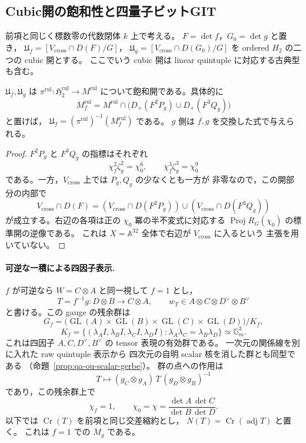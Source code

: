 
\subsection{Cubic開の飽和性と四量子ビットGIT}
\label{subsec:qa-global-cubic-git-comparison}

前項と同じく標数零の代数閉体 $k$ 上で考える。
$F=\det f$，$G_0=\det g$ と置き，
$\mathfrak U_f=[V_{\mathrm{cross}}\cap D(F)/G]$，
$\mathfrak U_g=[V_{\mathrm{cross}}\cap D(G_0)/G]$
を ordered $H_2$ の二つの cubic 開とする。
ここでいう cubic 開は linear quintuple に対応する古典型も含む。

\begin{proposition}[二つのcubic開は飽和している]
\label{prop:qa-global-cubic-opens-saturated}
$\mathfrak U_f,\mathfrak U_g$ は
$\pi^{\mathrm{rul}}:\mathfrak H_2^{\mathrm{rul}}\to M^{\mathrm{rul}}$
について飽和開である。具体的に
\[
 M_f^{\mathrm{rul}}
  =M^{\mathrm{rul}}\cap
       \bigl(D_+(F^2P_g)\cup D_+(F^3Q_g)\bigr)
\]
と置けば，
$\mathfrak U_f=(\pi^{\mathrm{rul}})^{-1}(M_f^{\mathrm{rul}})$ である。
$g$ 側は $f,g$ を交換した式で与えられる。
\end{proposition}
\begin{proof}
$F^2P_g$ と $F^3Q_g$ の指標はそれぞれ
\[
 \chi_f^2\zeta_g^2=\chi_0^6,\qquad
 \chi_f^3\zeta_g^3=\chi_0^9
\]
である。一方，$V_{\mathrm{cross}}$ 上では $P_g,Q_g$ の少なくとも一方が
非零なので，この開部分の内部で
\[
 V_{\mathrm{cross}}\cap D(F)
 =
 (V_{\mathrm{cross}}\cap D(F^2P_g))
 \cup
 (V_{\mathrm{cross}}\cap D(F^3Q_g))
\]
が成立する。右辺の各項は正の $\chi_0$ 冪の半不変式に対応する
$\operatorname{Proj}R_G(\chi_0)$ の標準開の逆像である。
これは $X=\mathbb A^{32}$ 全体で右辺が $V_{\mathrm{cross}}$ に入るという
主張を用いていない。
\end{proof}

\paragraph{可逆な一積による四因子表示.}
$f$ が可逆なら $W=C\otimes A$ と同一視して $f=1$ とし，
\[
 T=f^{-1}g:D\otimes B\longrightarrow C\otimes A,\qquad
 w_T\in A\otimes C\otimes D^\vee\otimes B^\vee
\]
と書ける。この gauge の残余群は
\[
 G_f=
 \bigl(\operatorname{GL}(A)\times\operatorname{GL}(B)
       \times\operatorname{GL}(C)\times\operatorname{GL}(D)\bigr)/K_f,
\]
\[
 K_f=
 \{(\lambda_A I,\lambda_B I,\lambda_C I,\lambda_D I)
          :\lambda_A\lambda_C=\lambda_B\lambda_D\}
       \simeq\mathbb G_m^3 .
\]
これは四因子 $A,C,D^\vee,B^\vee$ の tensor 表現の有効群である。
一次元の関係線を別に入れた raw quintuple 表示から
四次元の自明 scalar 核を消した群とも同型である
（命題~\ref{prop:qa-ou-scalar-gerbe}）。
群の点への作用は
\[
 T\longmapsto
 (g_C\otimes g_A)\,T\,(g_D\otimes g_B)^{-1}
\]
であり，この残余群上で
\[
 \chi_f=1,\qquad
 \chi_0=\chi=\frac{\det A\,\det C}{\det B\,\det D}.
 \tag{CQ}\label{eq:qa-cubic-residual-character}
\]
以下では $\operatorname{Cr}(T)$ を前項と同じ交差縮約とし，
$N(T)=\operatorname{Cr}(\operatorname{adj}T)$ と置く。
これは $f=1$ での $M_g$ である。

